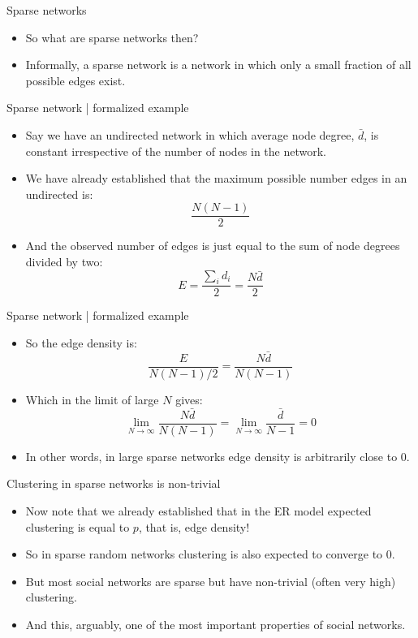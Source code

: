 \documentclass[
    hyperref={colorlinks,linkcolor=blue,urlcolor=blue,citecolor=blue}
]{beamer}
\begin{document}
\begin{frame}{Sparse networks}
\begin{itemize}
    \item So what are sparse networks then?
    \item<2-> Informally, a sparse network is a network in which only a small
    fraction of all possible edges exist.
\end{itemize}
\end{frame}

\begin{frame}{Sparse network | formalized example}
\begin{itemize}
    \item<2-> Say we have an undirected network in which average node degree,
    $\bar{d}$, is constant irrespective of the number of nodes in the network.
    \item<3-> We have already established that the maximum possible number
    edges in an undirected is:
    \[
        \frac{N(N-1)}{2}
    \]
    \item<4-> And the observed number of edges is just equal to the sum of
    node degrees divided by two:
    \[
        E = \frac{\sum_i d_i}{2} = \frac{N\bar{d}}{2}
    \]
\end{itemize}
\end{frame}

\begin{frame}{Sparse network | formalized example}
    \begin{itemize}
    \item<2-> So the edge density is:
    \[
        \frac{E}{N(N-1)/2} = \frac{N\bar{d}}{N(N-1)}
    \]
    \item<3-> Which in the limit of large $N$ gives:
    \[
        \lim_{N \to \infty} \frac{N\bar{d}}{N(N-1)}
        =
        \lim_{N \to \infty} \frac{\bar{d}}{N-1}
        =
        0
    \]
    \item<4-> In other words, in large sparse networks edge density
    is arbitrarily close to $0$.
\end{itemize}
\end{frame}

\begin{frame}{Clustering in sparse networks is non-trivial}
\begin{itemize}
    \item<2-> Now note that we already established that in the ER model
    expected clustering is equal to $p$, that is, edge density!
    \item<3-> So in sparse random networks clustering is also expected
    to converge to $0$.
    \item<4-> But most social networks are sparse but have non-trivial
    (often very high) clustering.
    \item<5-> And this, arguably, one of the most important properties
    of social networks.
\end{itemize}
\end{frame}
\end{document}
